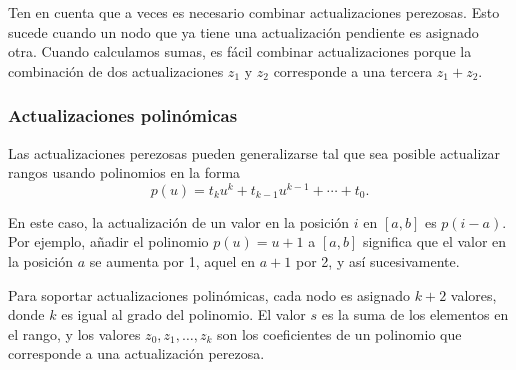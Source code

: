 \begin{center}
\end{center}

Ten en cuenta que a veces es necesario combinar actualizaciones perezosas.
Esto sucede cuando un nodo que ya tiene una actualización pendiente es
asignado otra. Cuando calculamos sumas, es fácil combinar actualizaciones
porque la combinación de dos actualizaciones $z_1$ y $z_2$ corresponde a
una tercera $z_1+z_2$.

\subsubsection{Actualizaciones polinómicas}

Las actualizaciones perezosas pueden generalizarse tal que sea posible
actualizar rangos usando polinomios en la forma
\[p(u) = t_k u^k + t_{k-1} u^{k-1} + \cdots + t_0.\]

En este caso, la actualización de un valor en la posición $i$ en $[a,b]$
es $p(i-a)$. Por ejemplo, añadir el polinomio $p(u)=u+1$ a $[a,b]$ significa
que el valor en la posición $a$ se aumenta por 1, aquel en $a+1$ por 2,
y así sucesivamente.

Para soportar actualizaciones polinómicas, cada nodo es asignado $k+2$
valores, donde $k$ es igual al grado del polinomio. El valor $s$ es la suma
de los elementos en el rango, y los valores $z_0,z_1,\ldots,z_k$ son los
coeficientes de un polinomio que corresponde a una actualización perezosa.

